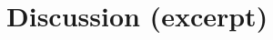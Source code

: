 \documentclass[11pt,a4paper]{article}
\begin{document}
\section{Discussion (excerpt)}



\end{document}

